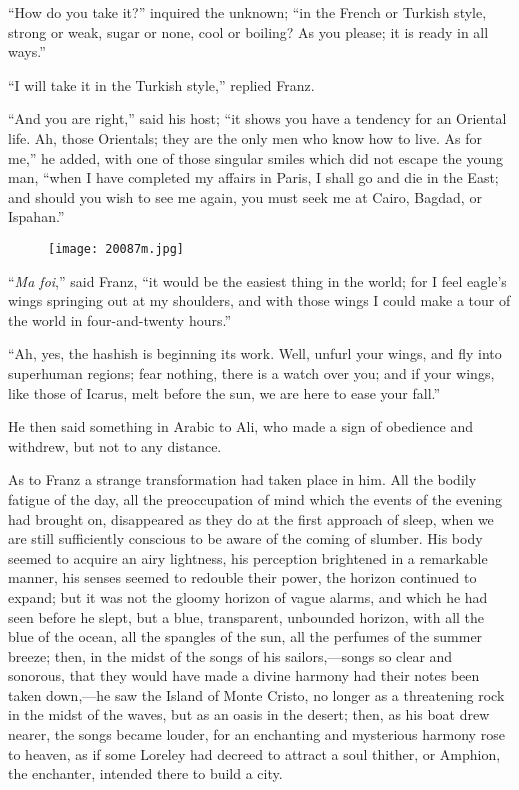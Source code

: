 “How do you take it?” inquired the unknown; “in the French or Turkish
style, strong or weak, sugar or none, cool or boiling? As you please;
it is ready in all ways.”

“I will take it in the Turkish style,” replied Franz.

“And you are right,” said his host; “it shows you have a tendency for
an Oriental life. Ah, those Orientals; they are the only men who know
how to live. As for me,” he added, with one of those singular smiles
which did not escape the young man, “when I have completed my affairs
in Paris, I shall go and die in the East; and should you wish to see me
again, you must seek me at Cairo, Bagdad, or Ispahan.”

\begin{figure}[ht]
\texttt{[image: 20087m.jpg]}
\end{figure}

“\textit{Ma foi},” said Franz, “it would be the easiest thing in the world;
for I feel eagle’s wings springing out at my shoulders, and with those
wings I could make a tour of the world in four-and-twenty hours.”

“Ah, yes, the hashish is beginning its work. Well, unfurl your wings,
and fly into superhuman regions; fear nothing, there is a watch over
you; and if your wings, like those of Icarus, melt before the sun, we
are here to ease your fall.”

He then said something in Arabic to Ali, who made a sign of obedience
and withdrew, but not to any distance.

As to Franz a strange transformation had taken place in him. All the
bodily fatigue of the day, all the preoccupation of mind which the
events of the evening had brought on, disappeared as they do at the
first approach of sleep, when we are still sufficiently conscious to be
aware of the coming of slumber. His body seemed to acquire an airy
lightness, his perception brightened in a remarkable manner, his senses
seemed to redouble their power, the horizon continued to expand; but it
was not the gloomy horizon of vague alarms, and which he had seen
before he slept, but a blue, transparent, unbounded horizon, with all
the blue of the ocean, all the spangles of the sun, all the perfumes of
the summer breeze; then, in the midst of the songs of his
sailors,—songs so clear and sonorous, that they would have made a
divine harmony had their notes been taken down,—he saw the Island of
Monte Cristo, no longer as a threatening rock in the midst of the
waves, but as an oasis in the desert; then, as his boat drew nearer,
the songs became louder, for an enchanting and mysterious harmony rose
to heaven, as if some Loreley had decreed to attract a soul thither, or
Amphion, the enchanter, intended there to build a city.


